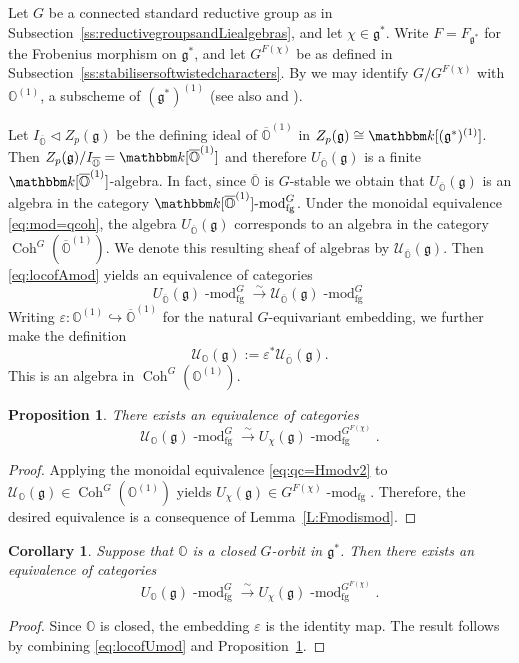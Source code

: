 \documentclass[twoside,12pt,reqno]{amsart}
\newtheorem{Proposition}[Theorem]{Proposition}
\newtheorem{Corollary}[Theorem]{Corollary}
\theoremstyle{remark}
\numberwithin{equation}{section}
\def\isoto{\overset{\sim}{\longrightarrow}}
\def\k{{\mathbbm k}}
\def\lmod{\!\operatorname{-mod}}
\def\Coh{\operatorname{Coh}}
\def\o{\overline}
\def\O{{\mathbb O}}
\def\cO{{\overline{\mathbb O}}}
\def\g{{\mathfrak g}}
\def\U{\mathcal{U}}
\newcommand{\fg}{\operatorname{fg}}
\begin{document}
Let $G$ be a connected standard reductive group as in Subsection~\ref{ss:reductivegroupsandLiealgebras}, and let $\chi\in\g^*$. Write $F=F_{\g^*}$ for the Frobenius morphism on $\g^*$, and let $G^{F(\chi)}$ be as defined in Subsection~\ref{ss:stabilisersoftwistedcharacters}. By \cite[I.5.6(2)]{JanRAGS} we may identify $G/G^{F(\chi)}$ with $\O^{(1)}$, a subscheme of $(\g^*)^{(1)}$ (see also \cite[Proposition I.9.5]{JanRAGS} and \cite[]{JaNO}). 

Let $I_{\o \O}\lhd Z_p(\g)$ be the defining ideal of $\o \O^{(1)}$ in $Z_p(\g)\cong \k[(\g^*)^{(1)}]$. Then $Z_p(\g)/I_{\o \O}=\k[\o \O^{(1)}]$ and therefore $U_{\o \O}(\g)$ is a finite $\k[\o \O^{(1)}]$-algebra. In fact, since $\o \O$ is $G$-stable we obtain that $U_{\o \O}(\g)$ is an algebra in the category $\k[\o \O^{(1)}]\lmod^G_{\fg}$. Under the monoidal equivalence \eqref{eq:mod=qcoh}, the algebra $U_{\o \O}(\g)$ corresponds to an algebra in the category $\Coh^G(\o \O^{(1)})$. We denote this resulting sheaf of algebras by $\U_{\o \O}(\g).$ Then \eqref{eq:locofAmod} yields an equivalence of categories 
\begin{equation}\label{eq:locofUmod}
    U_{\o \O}(\g)\lmod^G_{\fg}\isoto \U_{\o \O}(\g)\lmod^G_{\fg}
\end{equation}
Writing $\varepsilon:\O^{(1)}\hookrightarrow \cO^{(1)}$ for the natural $G$-equivariant embedding, we further make the definition $$\U_\O(\g):=\varepsilon^*\U_{\o \O}(\g).$$ This is an algebra in $\Coh^G(\O^{(1)})$.
\begin{Proposition}\label{P:MainEquiv}
    There exists an equivalence of categories 
    \begin{equation}\label{eq:descUg}
        \U_\O(\g)\lmod^G_{\fg}\isoto U_\chi(\g)\lmod^{G^{F(\chi)}}_{\fg}.
    \end{equation}
\end{Proposition}
\begin{proof}
    Applying the monoidal equivalence \eqref{eq:qc=Hmodv2} to $\U_\O(\g)\in\Coh^G(\O^{(1)})$ yields $U_\chi(\g)\in G^{F(\chi)}\lmod_{\fg}$. Therefore, the desired equivalence is a consequence of Lemma~\ref{L:Fmodismod}.
\end{proof}

\begin{Corollary}\label{c:locofUXmod}
    Suppose that $\O$ is a closed $G$-orbit in $\g^*$. Then there exists an equivalence of categories 
    \begin{equation}\label{eq:mainequiv}
    U_\O(\g)\lmod^G_{\fg}\isoto U_\chi(\g)\lmod^{G^{F(\chi)}}_{\fg}.
    \end{equation}
\end{Corollary}
\begin{proof}
    Since $\O$ is closed, the embedding $\varepsilon$ is the identity map. The result follows by combining \eqref{eq:locofUmod} and Proposition~\ref{P:MainEquiv}.
\end{proof}
\end{document}

